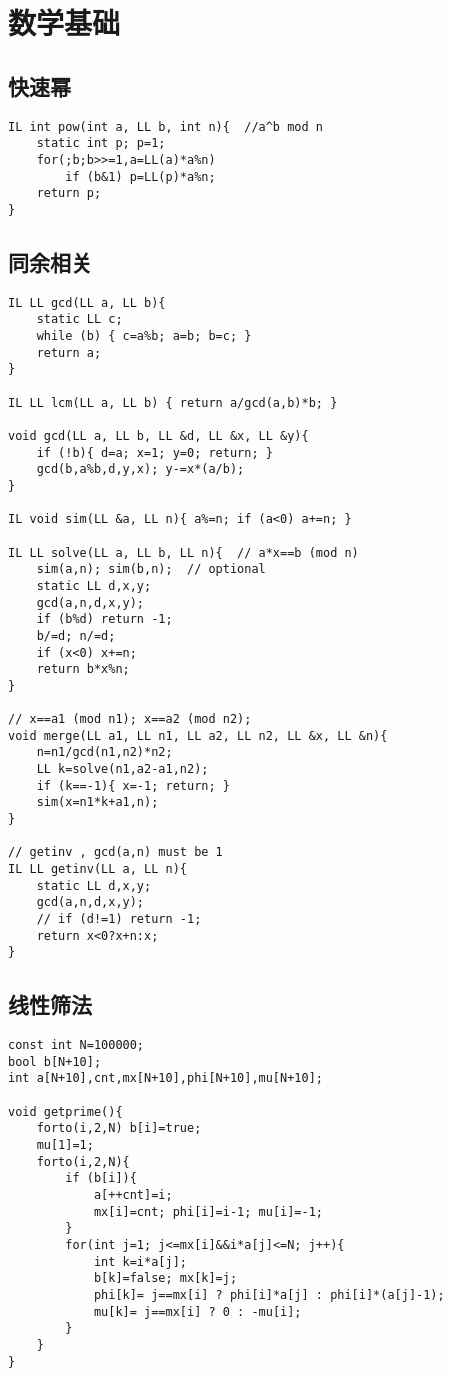 \documentclass{article}
\begin{document}
\section{数学基础}

\subsection{快速幂}
\begin{lstlisting}
IL int pow(int a, LL b, int n){  //a^b mod n
	static int p; p=1;
	for(;b;b>>=1,a=LL(a)*a%n)
		if (b&1) p=LL(p)*a%n;
    return p;
}
\end{lstlisting}

\subsection{同余相关}
\begin{lstlisting}
IL LL gcd(LL a, LL b){
	static LL c;
	while (b) { c=a%b; a=b; b=c; }
	return a;
}

IL LL lcm(LL a, LL b) { return a/gcd(a,b)*b; }

void gcd(LL a, LL b, LL &d, LL &x, LL &y){
	if (!b){ d=a; x=1; y=0; return; }
	gcd(b,a%b,d,y,x); y-=x*(a/b);
}

IL void sim(LL &a, LL n){ a%=n; if (a<0) a+=n; }

IL LL solve(LL a, LL b, LL n){  // a*x==b (mod n)
	sim(a,n); sim(b,n);  // optional
	static LL d,x,y;
	gcd(a,n,d,x,y);
	if (b%d) return -1;
	b/=d; n/=d;
	if (x<0) x+=n;
	return b*x%n;
}

// x==a1 (mod n1); x==a2 (mod n2);
void merge(LL a1, LL n1, LL a2, LL n2, LL &x, LL &n){
	n=n1/gcd(n1,n2)*n2;
	LL k=solve(n1,a2-a1,n2);	
	if (k==-1){ x=-1; return; }
	sim(x=n1*k+a1,n);
}

// getinv , gcd(a,n) must be 1
IL LL getinv(LL a, LL n){
	static LL d,x,y;
	gcd(a,n,d,x,y);
	// if (d!=1) return -1;
	return x<0?x+n:x;
}
\end{lstlisting}

\subsection{线性筛法}
\begin{lstlisting}
const int N=100000;
bool b[N+10];
int a[N+10],cnt,mx[N+10],phi[N+10],mu[N+10];

void getprime(){
	forto(i,2,N) b[i]=true;
	mu[1]=1;
	forto(i,2,N){
		if (b[i]){
			a[++cnt]=i;
			mx[i]=cnt; phi[i]=i-1; mu[i]=-1;
		}
		for(int j=1; j<=mx[i]&&i*a[j]<=N; j++){
			int k=i*a[j];
			b[k]=false; mx[k]=j;
			phi[k]= j==mx[i] ? phi[i]*a[j] : phi[i]*(a[j]-1);
			mu[k]= j==mx[i] ? 0 : -mu[i];
		}
	}
}
\end{lstlisting}
\end{document}
